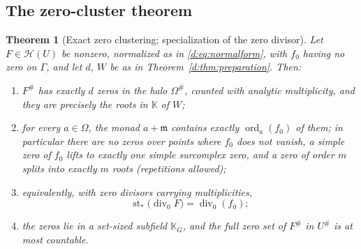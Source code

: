 \documentclass[11pt,a4paper]{article}
\numberwithin{equation}{section}
\newtheorem{theorem}{Theorem}[section]
\theoremstyle{definition}
\theoremstyle{remark}
\theoremstyle{plain}
\newcommand{\K}{\mathbb K}
\newcommand{\mm}{\mathfrak m}
\DeclareMathOperator{\st}{st}
\DeclareMathOperator{\ord}{ord}
\newcommand{\halo}[1]{#1^{\#}}
\newcommand{\ev}[1]{#1^{\#}}
\newcommand{\Hc}{\mathcal H}
\begin{document}
\subsection{The zero-cluster theorem}
\label{d:sub:zerocluster}

\begin{theorem}[Exact zero clustering; specialization of the zero divisor]
\label{d:thm:zerocluster}
Let $F\in\Hc(U)$ be nonzero, normalized as in
\eqref{d:eq:normalform}, with $f_0$ having no zero on $\Gamma$, and let
$d$, $W$ be as in Theorem~\ref{d:thm:preparation}.  Then:
\begin{enumerate}[label=(\roman*)]
\item $\ev F$ has exactly $d$ zeros in the halo $\halo\Omega$, counted
with analytic multiplicity, and they are precisely the roots in $\K$ of
$W$;
\item for every $a\in\Omega$, the monad $a+\mm$ contains exactly
$\ord_a(f_0)$ of them; in particular there are no zeros over points
where $f_0$ does not vanish, a simple zero of $f_0$ lifts to exactly one
simple surcomplex zero, and a zero of order $m$ splits into exactly $m$
roots (repetitions allowed);
\item equivalently, with zero divisors carrying multiplicities,
\begin{equation}\label{d:eq:divisor}
 \st_{*}\bigl(\operatorname{div}_0F\bigr)=\operatorname{div}_0(f_0);
\end{equation}
\item the zeros lie in a set-sized subfield $\K_G$, and the full zero
set of $\ev F$ in $\halo U$ is at most countable.
\end{enumerate}
\end{theorem}
\end{document}
